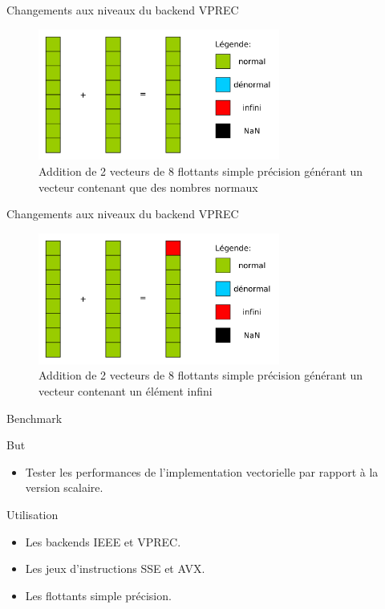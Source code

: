 \documentclass{beamer}
\begin{document}
\begin{frame}{Changements aux niveaux du backend VPREC}

  \begin{figure}
    \centering
    \includegraphics[width=300px]{../ressources/op_normal}
    \caption{\label{fig:ieee_simple_precision}Addition de 2 vecteurs de 8
      flottants simple précision générant un vecteur contenant que des nombres normaux}
  \end{figure}

\end{frame}

\begin{frame}{Changements aux niveaux du backend VPREC}

  \begin{figure}
    \centering
    \includegraphics[width=300px]{../ressources/op_infini}
    \caption{\label{fig:ieee_simple_precision}Addition de 2 vecteurs de 8
      flottants simple précision générant un vecteur contenant un élément infini}
  \end{figure}

\end{frame}

\begin{frame}{Benchmark}
  
  \begin{block}{But}
    \begin{itemize}
    \item Tester les performances de l'implementation vectorielle par rapport à la version scalaire. 
    \end{itemize}
  \end{block}

  \begin{block}{Utilisation}
    \begin{itemize}
    \item Les backends IEEE et VPREC.
    \item Les jeux d'instructions SSE et AVX.
    \item Les flottants simple précision.
    \end{itemize}
  \end{block}

\end{frame}
\end{document}
